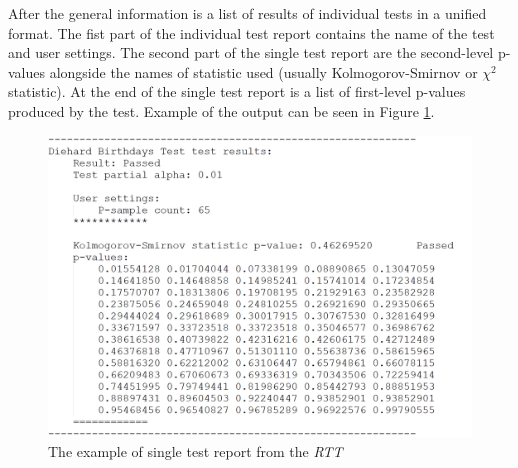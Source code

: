 \documentclass[
  digital,     %
  oneside,     %
  nosansbold,  %
  nocolorbold, %
  nolof,         %
  nolot,         %
]{fithesis4}
\begin{document}
After the general information is a list of results of individual tests in a unified format. The fist part of the individual test report contains the name of the test and user settings. The second part of the single test report are the second-level p-values alongside the names of statistic used (usually Kolmogorov-Smirnov or $\chi^2$ statistic). At the end of the single test report is a list of first-level p-values produced by the test. Example of the output can be seen in Figure \ref{fig:rtt_output_example}.

\begin{figure}
  \begin{center}
    \includegraphics[width=12cm]{figures/rtt_dieharder_output.png}
  \end{center}
  \caption{The example of single test report from the \emph{RTT}}
  \label{fig:rtt_output_example}
\end{figure}


\end{document}
